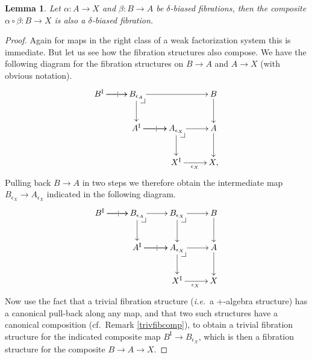 \documentclass[12pt]{article}
\makeatletter
\newcommand{\ie}{\emph{i.e.}}
\newcommand{\ra}{\ensuremath{\rightarrow}}
\renewcommand{\to}{\ensuremath{\rightarrow}}
\newcommand{\I}{\ensuremath{\mathrm{I}}}
\newtheorem{lemma}[theorem]{Lemma}
\theoremstyle{remark}
\newtheorem{remark}[theorem]{Remark}
\theoremstyle{definition}
\newcommand{\pbcorner}[1][dr]{\save*!/#1-1.2pc/#1:(-1,1)@^{|-}\restore}
\makeatother
\begin{document}
\begin{lemma}\label{lemma:fibrationscompose}
Let  $\alpha : A \ra X$ and $\beta: B\ra A$ be $\delta$-biased fibrations, then the composite $\alpha\circ\beta : B \ra X$ is also a $\delta$-biased fibration.
\end{lemma}
\begin{proof}
Again for maps in the right class of a weak factorization system this is immediate.  But let us see how the fibration structures also compose.  We have the following diagram for the fibration structures on $B\ra A$ and $A\ra X$ (with obvious notation).
\begin{equation}\label{diagram:fibcomposition1}
\xymatrix{
B^\I \ar[r]|| \ar[r]  & B_{\epsilon_A} \ar[rr]  \ar[d] \pbcorner & & B \ar[d]\\
&A^\I \ar[r]|| \ar[r] & A_{\epsilon_X} \ar[d] \pbcorner \ar[r] & A \ar[d]\\
&& X^\I \ar[r]_{\epsilon_X} &  X,
}
\end{equation}
Pulling back $B\ra A$ in two steps we therefore obtain the intermediate map $B_{\epsilon_X} \to A_{\epsilon_X}$  indicated in the following diagram. 
\begin{equation}\label{diagram:fibcomposition2}
\xymatrix{
B^\I \ar[r]|| \ar[r]   & B_{\epsilon_A} \ar[r]  \ar[d] \pbcorner & B_{\epsilon_X}  \ar[d] \pbcorner \ar[r] & B \ar[d]\\
&A^\I \ar[r]|| \ar[r]  & A_{\epsilon_X} \ar[d] \pbcorner \ar[r] & A \ar[d]\\
&& X^\I \ar[r]_{\epsilon_X} &  X
}
\end{equation}
Now use the fact that a trivial fibration structure (\ie\ a +-algebra structure) has a canonical pull-back along any map, and that two such structures have a canonical composition (cf.\ Remark \ref{trivfibcomp}), to obtain a trivial fibration structure for the indicated composite map $B^\I \ra B_{\epsilon_X}$, which is then a fibration structure for the composite $B\to A\to X$.
\end{proof}

\end{document}
